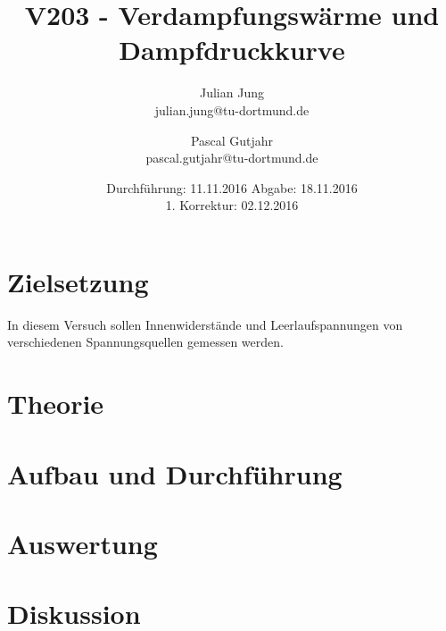 

\title{V203 - Verdampfungswärme und Dampfdruckkurve}
\author{Julian Jung \\ julian.jung@tu-dortmund.de
  \and Pascal Gutjahr \\ pascal.gutjahr@tu-dortmund.de}
  \date{Durchführung: 11.11.2016
  \hspace{3em}
  Abgabe: 18.11.2016 \\
  1. Korrektur: 02.12.2016}
  
\maketitle
\newpage
\tableofcontents
\newpage
\section{Zielsetzung}
In diesem Versuch sollen Innenwiderstände und Leerlaufspannungen von verschiedenen
Spannungsquellen gemessen werden.
\section{Theorie}
% 
\section{Aufbau und Durchführung}
% 
\section{Auswertung}
% 
\section{Diskussion}
% 
\printbibliography

